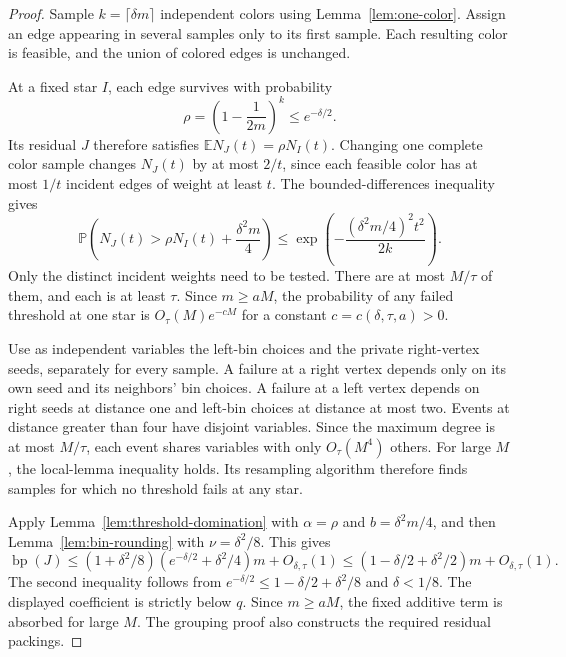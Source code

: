 \documentclass[11pt]{article}
\theoremstyle{definition}\newtheorem{algorithm}{Algorithm}[section]
\numberwithin{equation}{section}
\theoremstyle{remark}\newtheorem*{remark}{Remark}
\begin{document}
\begin{proof}
Sample $k=\lceil\delta m\rceil$ independent colors using
Lemma~\ref{lem:one-color}. Assign an edge appearing in several samples
only to its first sample. Each resulting color is feasible, and the
union of colored edges is unchanged.

At a fixed star $I$, each edge survives with probability
\[
 \rho=\left(1-\frac1{2m}\right)^k\le e^{-\delta/2}.
\]
Its residual $J$ therefore satisfies $\mathbb E N_J(t)=\rho N_I(t)$.
Changing one complete color sample changes $N_J(t)$ by at most $2/t$,
since each feasible color has at most $1/t$ incident edges of weight
at least $t$. The bounded-differences inequality gives
\[
 \mathbb P\left(N_J(t)>\rho N_I(t)+\frac{\delta^2m}{4}\right)
 \le\exp\left(-\frac{(\delta^2m/4)^2t^2}{2k}\right).
\]
Only the distinct incident weights need to be tested. There are at most
$M/\tau$ of them, and each is at least $\tau$. Since $m\ge aM$, the
probability of any failed threshold at one star is
$O_\tau(M)e^{-cM}$ for a constant $c=c(\delta,\tau,a)>0$.

Use as independent variables the left-bin choices and the private
right-vertex seeds, separately for every sample. A failure at a right
vertex depends only on its own seed and its neighbors' bin choices.
A failure at a left vertex depends on right seeds at distance one and
left-bin choices at distance at most two. Events at distance greater
than four have disjoint variables. Since the maximum degree is at most
$M/\tau$, each event shares variables with only $O_\tau(M^4)$ others.
For large $M$, the local-lemma inequality holds. Its resampling algorithm
therefore finds samples for which no threshold fails at any star.

Apply Lemma~\ref{lem:threshold-domination} with
$\alpha=\rho$ and $b=\delta^2m/4$, and then
Lemma~\ref{lem:bin-rounding} with $\nu=\delta^2/8$. This gives
\[
 \operatorname{bp}(J)
 \le(1+\delta^2/8)(e^{-\delta/2}+\delta^2/4)m+O_{\delta,\tau}(1)
 \le(1-\delta/2+\delta^2/2)m+O_{\delta,\tau}(1).
\]
The second inequality follows from
$e^{-\delta/2}\le1-\delta/2+\delta^2/8$ and $\delta<1/8$.
The displayed coefficient is strictly below $q$. Since $m\ge aM$,
the fixed additive term is absorbed for large $M$. The grouping proof
also constructs the required residual packings.
\end{proof}
\end{document}
